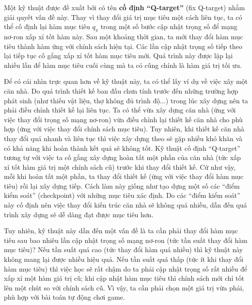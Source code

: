 	Một kỹ thuật được đề xuất bởi \cite{mnihdqn2015} có tên \textbf{cố định ``Q-target''} (fix Q-target) nhằm giải quyết vấn đề này.
	Thay vì thay đổi giá trị mục tiêu một cách liên tục, ta có thể cố định lại hàm mục tiêu $q_{\pi}$ trong một số bước cập nhật trọng số để mạng nơ-ron xấp xỉ tốt hàm này.
	Sau một khoảng thời gian, ta mới thay đổi hàm mục tiêu thành hàm ứng với chính sách hiện tại.
	Các lần cập nhật trọng số tiếp theo lại tiếp tục cố gắng xấp xỉ tốt hàm mục tiêu mới.
	Quá trình này được lặp lại nhiều lần để hàm mục tiêu cuối cùng mà ta có cũng chính là hàm giá trị tối ưu.
	
	Để có cái nhìn trực quan hơn về kỹ thuật này, ta có thể lấy ví dụ về việc xây một căn nhà.
	Do quá trình thiết kế ban đầu chưa tính trước đến những trường hợp phát sinh (như thiếu vật liệu, thợ không đủ trình độ...) trong lúc xây dựng nên ta phải điều chỉnh thiết kế lại liên tục.
	Ta có thể vừa xây dựng căn nhà (ứng với việc thay đổi trọng số mạng nơ-ron) vừa điều chỉnh lại thiết kế căn nhà cho phù hợp (ứng với việc thay đổi chính sách mục tiêu).
	Tuy nhiên, khi thiết kế căn nhà thay đổi quá nhanh và liên tục thì việc xây dựng theo sẽ gặp nhiều khó khăn và có khả năng khi hoàn thành kết quả sẽ không tốt.
	Kỹ thuật cố định ``Q-target'' tương tự với việc ta cố gắng xây dựng hoàn tất một phần của căn nhà (tức xấp xỉ tốt hàm giá trị một chính sách cũ) trước khi thay đổi thiết kế.
	Cứ như vậy, mỗi khi hoàn tất một phần, ta thay đổi thiết kế (ứng với việc thay đổi hàm mục tiêu) rồi lại xây dựng tiếp.
	Cách làm này giống như tạo dựng một số các ``điểm kiểm soát'' (checkpoint) với những mục tiêu xác định.
	Do các ``điểm kiểm soát'' này cố định nên việc thay đổi kiến trúc căn nhà sẽ không quá nhiều, dẫn đến quá trình xây dựng sẽ dễ dàng đạt được mục tiêu hơn.
	
	Tuy nhiên, kỹ thuật này dẫn đến một vấn đề là ta cần phải thay đổi hàm mục tiêu sau bao nhiêu lần cập nhật trọng số mạng nơ-ron (tức tần suất thay đổi hàm mục tiêu)?
	Nếu tần suất quá cao (tức thay đổi hàm quá nhiều) thì kỹ thuật này không mang lại được nhiều hiệu quả.
	Nếu tần suất quá thấp (tức ít khi thay đổi hàm mục tiêu) thì việc học sẽ rất chậm do ta phải cập nhật trọng số rất nhiều để xấp xỉ một hàm giá trị cũ; khi cập nhật hàm mục tiêu thì chính sách mới chỉ tốt lên một chút so với chính sách cũ.
	Vì vậy, ta cần phải chọn một giá trị vừa phải, phù hợp với bài toán tự động chơi game.

